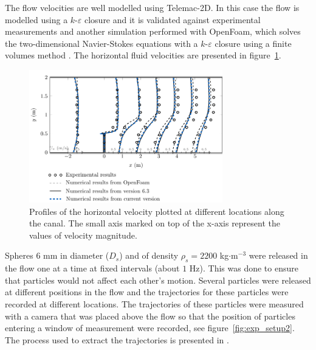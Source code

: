 The flow velocities are well modelled using Telemac-2D. In this case the flow is modelled using a $k$-$\varepsilon$
closure and it is validated against experimental measurements and another simulation performed with OpenFoam, which
solves the two-dimensional Navier-Stokes equations with a $k$-$\varepsilon$ closure using a finite volumes method
\citep{OpenFoam}. The horizontal fluid velocities are presented in figure~\ref{fig:profil_vitesses_canal}.

\begin{figure}[H]%
\begin{center}
%
  \includegraphics[width=0.75\textwidth]{./Figures/CanalAlgFluidVelocities}
%
\end{center}
\caption{Profiles of the horizontal velocity plotted at different locations along the canal. The small axis marked on
top of the x-axis represent the values of velocity magnitude.}
\label{fig:profil_vitesses_canal}
\end{figure}

Spheres $6$ mm in diameter ($D_s$) and of density $\rho_s=2200$ kg$\cdot$m$^{-3}$ were released in the flow one at a
time at fixed intervals (about $1$ Hz). This was done to ensure that particles would not affect each other's motion.
Several particles were released at different positions in the flow and the trajectories for these particles were
recorded at different locations. The trajectories of these particles were measured with a camera that was placed above
the flow so that the position of particles entering a window of measurement were recorded, see
figure~\ref{fig:exp_setup2}. The process used to extract the trajectories is presented in \citet{Joly_these}.

